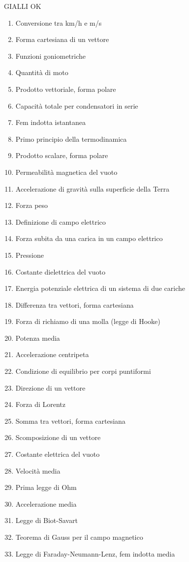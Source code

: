 \documentclass[a4paper,11pt,italian]{article}
\begin{document}
GIALLI OK
\begin{enumerate}
\item Conversione tra km/h e m/s
\item Forma cartesiana di un vettore
\item Funzioni goniometriche
\item Quantità di moto
\item Prodotto vettoriale, forma polare
\item Capacità totale per condensatori in serie
\item Fem indotta istantanea
\item Primo principio della termodinamica
\item Prodotto scalare, forma polare
\item Permeabilità magnetica del vuoto
\item Accelerazione di gravità sulla superficie della Terra 
\item Forza peso
\item Definizione di campo elettrico
\item Forza subita da una carica in un campo elettrico
\item Pressione 
\item Costante dielettrica del vuoto
\item Energia potenziale elettrica di un sistema di due cariche
\item Differenza tra vettori, forma cartesiana
\item Forza di richiamo di una molla (legge di Hooke)
\item Potenza media
\item Accelerazione centripeta
\item Condizione di equilibrio per corpi puntiformi
\item Direzione di un vettore 
\item Forza di Lorentz
\item Somma tra vettori, forma cartesiana
\item Scomposizione di un vettore
\item Costante elettrica del vuoto 
\item Velocità media
\item Prima legge di Ohm
\item Accelerazione media
\item Legge di Biot-Savart
\item Teorema di Gauss per il campo magnetico
\item Legge di Faraday-Neumann-Lenz, fem indotta media

\end{enumerate}
\end{document}
